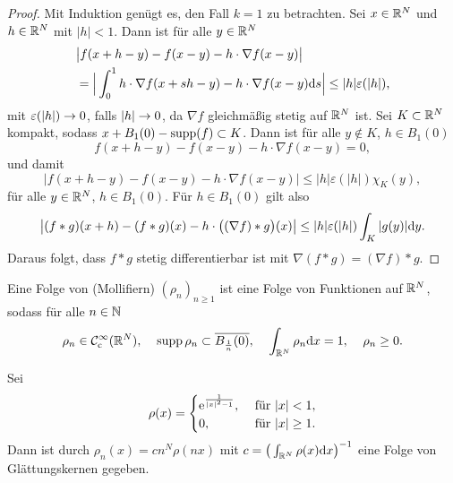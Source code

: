 \begin{proof}
	Mit Induktion genügt es, den Fall \(k=1\) zu betrachten. Sei \(x\in\mathbb{R}^N\) und \(h\in\mathbb{R}^N\) mit \(|h|<1\). Dann ist für alle \(y\in\mathbb{R}^N\)
	\begin{align*}
		&\big|f(x+h-y)-f(x-y)-h\cdot\nabla f(x-y)\big|\\
		&=\Big|\int_0^1h\cdot\nabla f(x+sh-y)-h\cdot\nabla f(x-y)\mathrm{d}s\Big|\leq|h|\varepsilon(|h|),
	\end{align*}
	mit \(\varepsilon(|h|)\rightarrow0\), falls \(|h|\rightarrow0\), da \(\nabla f\) gleichmäßig stetig auf \(\mathbb{R}^N\) ist. Sei \(K\subset\mathbb{R}^N\) kompakt, sodass \(x+B_1(0)-\operatorname{supp}(f)\subset K\). Dann ist für alle \(y\notin K\), \(h\in B_1(0)\)
	\begin{equation*}
		f(x+h-y)-f(x-y)-h\cdot\nabla f(x-y)=0,
	\end{equation*}
	und damit
	\begin{equation*}
		\big|f(x+h-y)-f(x-y)-h\cdot\nabla f(x-y)\big|\leq|h|\varepsilon(|h|)\chi_K(y),
	\end{equation*}
	für alle \(y\in\mathbb{R}^N\), \(h\in B_1(0)\). Für \(h\in B_1(0)\) gilt also
	\begin{equation*}
		\big|(f\ast g)(x+h)-(f\ast g)(x)-h\cdot\big((\nabla f)\ast g\big)(x)\big|
		\leq|h|\varepsilon(|h|)\int_K|g(y)|\mathrm{d}y.
	\end{equation*}
	Daraus folgt, dass \(f\ast g\) stetig differentierbar ist mit \(\nabla(f\ast g)=(\nabla f)\ast g\).
\end{proof}
\begin{definition}
	Eine Folge von  (Mollifiern) \((\rho_n)_{n\geq1}\) ist eine Folge von Funktionen auf \(\mathbb{R}^N\), sodass für alle \(n\in\mathbb{N}\)
	\begin{equation*}
		\rho_n\in\mathcal{C}_{\mathrm{c}}^\infty(\mathbb{R}^N),\;\;\;\;
		\operatorname{supp}\rho_n\subset\overline{B_{\frac{1}{n}}(0)},\;\;\;\;
		\int_{\mathbb{R}^N}\rho_n\mathrm{d}x=1,\;\;\;\;
		\rho_n\geq0.
	\end{equation*}
\end{definition}
\begin{bsp}
	Sei
	\begin{equation*}
		\rho(x)=
		\begin{cases}
			\mathrm{e}^{\frac{1}{|x|^2-1}},&\text{ für }|x|<1,\\
			0,&\text{ für }|x|\geq1.
		\end{cases}
	\end{equation*}
	Dann ist durch \(\rho_n(x)=cn^N\rho(nx)\) mit \(c=\big(\int_{\mathbb{R}^N} \rho(x)\mathrm{d}x\big)^{-1}\) eine Folge von Glättungskernen gegeben.
\end{bsp}
